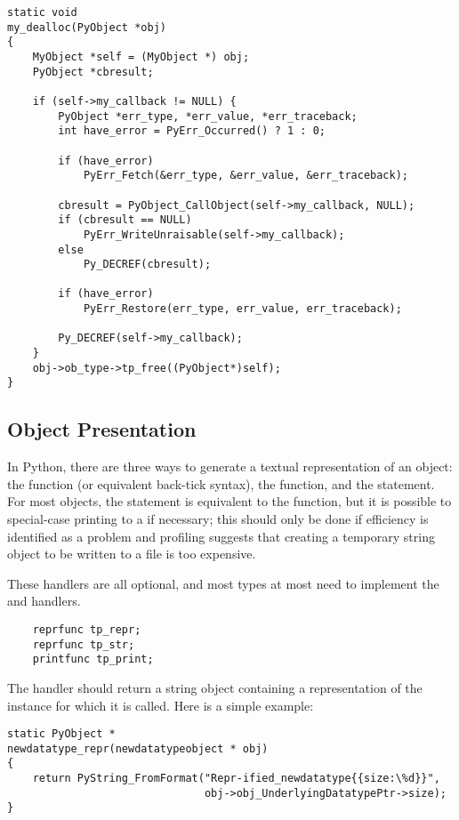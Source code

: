\begin{verbatim}
static void
my_dealloc(PyObject *obj)
{
    MyObject *self = (MyObject *) obj;
    PyObject *cbresult;

    if (self->my_callback != NULL) {
        PyObject *err_type, *err_value, *err_traceback;
        int have_error = PyErr_Occurred() ? 1 : 0;

        if (have_error)
            PyErr_Fetch(&err_type, &err_value, &err_traceback);

        cbresult = PyObject_CallObject(self->my_callback, NULL);
        if (cbresult == NULL)
            PyErr_WriteUnraisable(self->my_callback);
        else
            Py_DECREF(cbresult);

        if (have_error)
            PyErr_Restore(err_type, err_value, err_traceback);

        Py_DECREF(self->my_callback);
    }
    obj->ob_type->tp_free((PyObject*)self);
}
\end{verbatim}


\subsection{Object Presentation}

In Python, there are three ways to generate a textual representation
of an object: the  function (or
equivalent back-tick syntax), the 
function, and the  statement.  For most objects, the
 statement is equivalent to the 
function, but it is possible to special-case printing to a
 if necessary; this should only be done if efficiency is
identified as a problem and profiling suggests that creating a
temporary string object to be written to a file is too expensive.

These handlers are all optional, and most types at most need to
implement the  and  handlers.

\begin{verbatim}
    reprfunc tp_repr;
    reprfunc tp_str;
    printfunc tp_print;
\end{verbatim}

The  handler should return a string object containing
a representation of the instance for which it is called.  Here is a
simple example:

\begin{verbatim}
static PyObject *
newdatatype_repr(newdatatypeobject * obj)
{
    return PyString_FromFormat("Repr-ified_newdatatype{{size:\%d}}",
                               obj->obj_UnderlyingDatatypePtr->size);
}
\end{verbatim}


